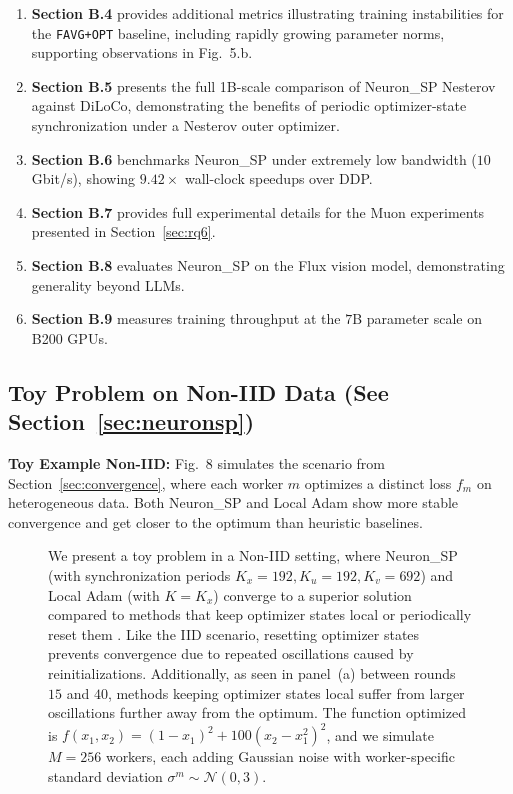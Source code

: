 \documentclass{article}
\begin{document}
\begin{enumerate}
\item \textbf{Section B.4} provides additional metrics illustrating training instabilities for the \texttt{FAVG+OPT} baseline, including rapidly growing parameter norms, supporting observations in Fig.~5.b.
\item \textbf{Section B.5} presents the full 1B-scale comparison of Neuron\_SP Nesterov against DiLoCo, demonstrating the benefits of periodic optimizer-state synchronization under a Nesterov outer optimizer.
\item \textbf{Section B.6} benchmarks Neuron\_SP under extremely low bandwidth ($10$ Gbit/s), showing $9.42\times$ wall-clock speedups over DDP.
\item \textbf{Section B.7} provides full experimental details for the Muon experiments presented in Section~\ref{sec:rq6}.
\item \textbf{Section B.8} evaluates Neuron\_SP on the Flux vision model, demonstrating generality beyond LLMs.
\item \textbf{Section B.9} measures training throughput at the $7$B parameter scale on B200 GPUs.
\end{enumerate}

\subsection{Toy Problem on Non-IID Data (See Section~\ref{sec:neuronsp})}
\label{sec:b1_toy_noniid}

\textbf{Toy Example Non-IID:} Fig.~8 simulates the scenario from Section~\ref{sec:convergence}, where each worker $m$ optimizes a distinct loss $f_m$ on heterogeneous data. Both Neuron\_SP and Local Adam show more stable convergence and get closer to the optimum than heuristic baselines.

\begin{figure}[ht]
\centering
\caption{We present a toy problem in a Non-IID setting, where Neuron\_SP (with synchronization periods $K_x=192, K_u=192, K_v=692$) and Local Adam (with $K=K_x$) converge to a superior solution compared to methods that keep optimizer states local \citep{Douillard2023,Sani2025} or periodically reset them \citep{Sani2024,Iacob2025}. Like the IID scenario, resetting optimizer states prevents convergence due to repeated oscillations caused by reinitializations. Additionally, as seen in panel~(a) between rounds $15$ and $40$, methods keeping optimizer states local suffer from larger oscillations further away from the optimum. The function optimized is $f(x_1,x_2)=(1-x_1)^2+100(x_2-x_1^2)^2$, and we simulate $M=256$ workers, each adding Gaussian noise with worker-specific standard deviation $\sigma^m \sim \mathcal{N}(0,3)$.}
\label{fig:8}
\end{figure}
\end{document}
